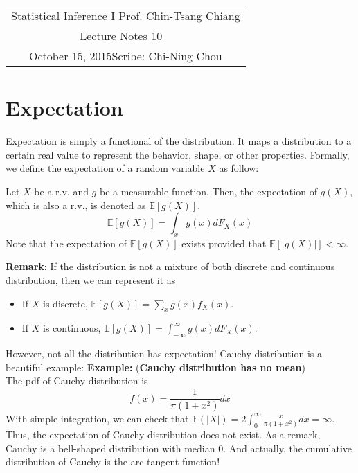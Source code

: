 \documentclass[11pt]{article}
\newcommand{\scribe}{Chi-Ning Chou}
\newcommand{\lecnum}{10}
\newcommand{\lecdate}{October 15, 2015}
\begin{document}
	
	\begin{center}
		\renewcommand{\arraystretch}{2}
		\begin{bfseries}
			\begin{tabular}{|c|}
				\hline
				Statistical Inference I \hfill Prof. Chin-Tsang Chiang\\
				\hspace{15em} {\large Lecture Notes \lecnum} \hspace{15em}\ \\
				\lecdate \hfill Scribe: \scribe\\
				\hline
			\end{tabular}
			\renewcommand{\arraystretch}{1}
		\end{bfseries}
	\end{center}
	
\section{Expectation}
Expectation is simply a functional of the distribution. It maps a distribution to a certain real value to represent the behavior, shape, or other properties. Formally, we define the expectation of a random variable $X$ as follow:
\begin{definition}[expectation]
	Let $X$ be a r.v. and $g$ be a measurable function. Then, the expectation of $g(X)$, which is also a r.v., is denoted as $\mathbb{E}[g(X)]$,\ie
	$$\mathbb{E}[g(X)] = \int_x g(x)dF_X(x)$$
	Note that the expectation of $\mathbb{E}[g(X)]$ exists provided that $\mathbb{E}[|g(X)|]<\infty$.
\end{definition}
{\bf Remark}:
If the distribution is not a mixture of both discrete and continuous distribution, then we can represent it as
\begin{itemize}
	\item If $X$ is discrete, $\mathbb{E}[g(X)] = \sum_x g(x)f_X(x)$.
	\item If $X$ is continuous, $\mathbb{E}[g(X)] = \int_{-\infty}^{\infty}g(x)dF_X(x)$.
\end{itemize}

However, not all the distribution has expectation! Cauchy distribution is a beautiful example:
{\bf Example: }({\bf Cauchy distribution has no mean})\\
The pdf of Cauchy distribution is
$$f(x) = \frac{1}{\pi(1+x^2)}dx$$
With simple integration, we can check that $\mathbb{E}(|X|) = 2\int_0^{\infty}\frac{x}{\pi(1+x^2)}dx=\infty$. Thus, the expectation of Cauchy distribution does not exist. As a remark, Cauchy is a bell-shaped distribution with median 0. And actually, the cumulative distribution of Cauchy is the arc tangent function!
\end{document}
